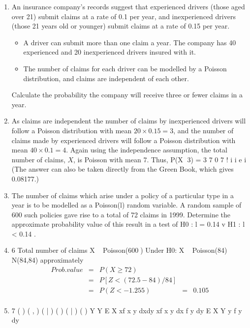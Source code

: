 \documentclass[a4paper,12pt]{article}
\begin{document}
\begin{enumerate}
\item  An insurance company’s records suggest that experienced drivers (those aged
over 21) submit claims at a rate of 0.1 per year, and inexperienced drivers (those 21 years old or younger) submit claims at a rate of 0.15 per year. 
\begin{itemize}
\item A driver can submit more than one claim a year. The company has 40 experienced and 20 inexperienced drivers insured with it.
\item The number of claims for each driver can be modelled by a Poisson distribution, and claims are independent of each other.
\end{itemize}
 Calculate the
probability the company will receive three or fewer claims in a year. 



\item  As claims are independent the number of claims by inexperienced drivers will
follow a Poisson distribution with mean $20 \times 0.15 = 3$, and the number of claims
made by experienced drivers will follow a Poisson distribution with mean
$40 \times 0.1 = 4$. Again using the independence assumption, the total number of
claims, $X$, is Poisson with mean 7.
Thus, P(X 3) =
3
7
0
7
!
i
i
e
i
(The answer can also be taken directly from the Green Book, which gives
0.08177.)

\newpage

\item The number of claims which arise under a policy of a particular type in a year
is to be modelled as a Poisson(l) random variable. A random sample of 600
such policies gave rise to a total of 72 claims in 1999.
Determine the approximate probability value of this result in a test of
H0 : l = 0.14 v H1 : l < 0.14 .
\item 6 Total number of claims X ~ Poisson(600)
Under H0: X ~ Poisson(84) ~ N(84,84) approximately
\begin{eqnarray*}
Prob. value &=& P(X \geq 72) \\ &=& P[Z < (72.5 - 84)/	84] \\ &=& P(Z < -1.255) &=& 0.105\\
\end{eqnarray*}
\item 7 ( ) ( , ) ( | ) ( ) ( | ) ( ) Y Y E X xf x y dxdy xf x y dx f y dy E X Y y f y dy


\end{enumerate}
\end{document}
